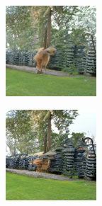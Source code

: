\documentclass{article}
\begin{document}
\begin{figure}
\begin{subfigure}[b]{0.5\linewidth}
\begin{subfigure}[b]{0.242\linewidth}
        \end{subfigure}
        \hfill
    \end{subfigure}%
    \begin{subfigure}[b]{0.5\linewidth}
        \begin{subfigure}[b]{0.242\linewidth}
        \includegraphics[width=\linewidth]{figures/imagenet128/solver_samples/imagenet128_fm_ot_72_05.png}
        \end{subfigure}
        \begin{subfigure}[b]{0.242\linewidth}
        \includegraphics[width=\linewidth]{figures/imagenet128/solver_samples/imagenet128_fm_ot_72_10.png}

\end{subfigure}
\end{subfigure}
\end{figure}
\end{document}

